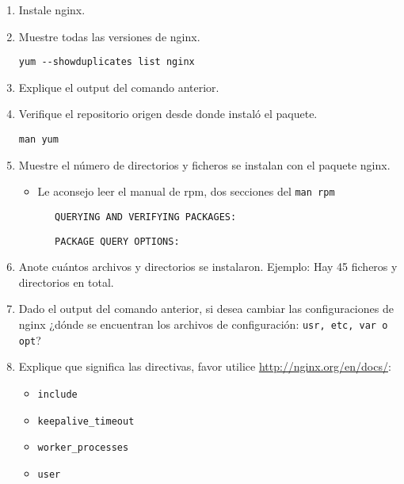 \documentclass[11pt]{exam}
\begin{document}
\begin{enumerate}
	\item Instale nginx.
	\item Muestre todas las versiones de nginx.
	\begin{lstlisting}
yum --showduplicates list nginx		
	\end{lstlisting}
	\item Explique el output del comando anterior.
\vspace{1in}
	\item Verifique el repositorio origen desde donde instaló el paquete.
		\begin{lstlisting}
man yum
	\end{lstlisting}
	\item Muestre el número de directorios y ficheros se instalan con el paquete nginx.
	\begin{itemize}
		\item Le aconsejo leer el manual de rpm, dos secciones del \texttt{man rpm}
			\begin{lstlisting}
   QUERYING AND VERIFYING PACKAGES:
	\end{lstlisting}
	\begin{lstlisting}
   PACKAGE QUERY OPTIONS:
	\end{lstlisting}
	\end{itemize}
	\item Anote cuántos archivos y directorios se instalaron.  Ejemplo: Hay 45 ficheros y directorios en total.
\vspace{1in}

	\item Dado el output del comando anterior, si desea cambiar las configuraciones de nginx ¿dónde se encuentran los archivos de configuración: \texttt{usr, etc, var o opt}?
\vspace{1in}

	\item Explique que significa las directivas, favor utilice \url{http://nginx.org/en/docs/}:
	\begin{itemize}
		\item \texttt{include}
		\vspace{0.3in}
		\item \texttt{keepalive\_timeout}
				\vspace{0.3in}
		\item \texttt{worker\_processes}
				\vspace{0.3in}
		\item \texttt{user}
				\vspace{0.3in}


\end{itemize}
\end{enumerate}
\end{document}
